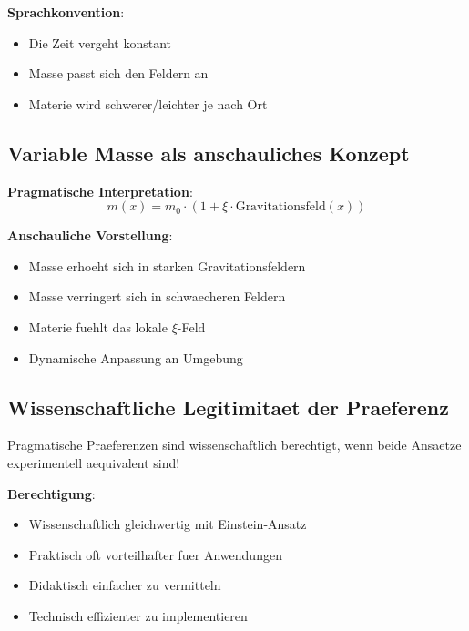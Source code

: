 \documentclass[12pt,a4paper]{article}
\newcommand{\xipar}{\xi}
\theoremstyle{definition}
\theoremstyle{remark}
\begin{document}
	\textbf{Sprachkonvention}:
	\begin{itemize}
		\item Die Zeit vergeht konstant
		\item Masse passt sich den Feldern an
		\item Materie wird schwerer/leichter je nach Ort
	\end{itemize}
	
	\subsection{Variable Masse als anschauliches Konzept}
	
	\textbf{Pragmatische Interpretation}:
	\begin{equation}
		m(x) = m_0 \cdot (1 + \xipar \cdot \text{Gravitationsfeld}(x))
	\end{equation}
	
	\textbf{Anschauliche Vorstellung}:
	\begin{itemize}
		\item Masse erhoeht sich in starken Gravitationsfeldern
		\item Masse verringert sich in schwaecheren Feldern
		\item Materie fuehlt das lokale $\xipar$-Feld
		\item Dynamische Anpassung an Umgebung
	\end{itemize}
	
	\subsection{Wissenschaftliche Legitimitaet der Praeferenz}
	
	\begin{tcolorbox}[colback=green!5!white,colframe=green!75!black,title=Wichtige Erkenntnis]
		Pragmatische Praeferenzen sind wissenschaftlich berechtigt, wenn beide Ansaetze experimentell aequivalent sind!
	\end{tcolorbox}
	
	\textbf{Berechtigung}:
	\begin{itemize}
		\item Wissenschaftlich gleichwertig mit Einstein-Ansatz
		\item Praktisch oft vorteilhafter fuer Anwendungen
		\item Didaktisch einfacher zu vermitteln
		\item Technisch effizienter zu implementieren
	\end{itemize}
	
\end{document}
